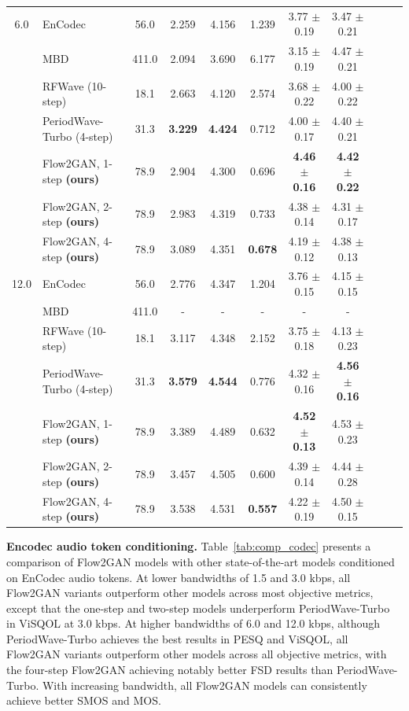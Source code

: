 \documentclass{article} %
\begin{document}
\begin{table}[h]
{\begin{tabular}{c|l|c|cccccccc}
\midrule
6.0 & EnCodec & 56.0 & 2.259 & 4.156 & 1.239 & 3.77 $\pm$ 0.19 & 3.47 $\pm$ 0.21\\
 & MBD & 411.0 & 2.094 & 3.690 & 6.177 & 3.15 $\pm$ 0.19 & 4.47 $\pm$ 0.21\\
& RFWave (10-step) & 18.1 & 2.663 & 4.120 & 2.574 & 3.68 $\pm$ 0.22 & 4.00 $\pm$ 0.22\\
 & PeriodWave-Turbo (4-step) & 31.3 & \textbf{3.229} & \textbf{4.424} & 0.712 & 4.00 $\pm$ 0.17 & 4.40 $\pm$ 0.21\\
& Flow2GAN, 1-step \textbf{(ours)} & 78.9 & 2.904 & 4.300 & 0.696 & \textbf{4.46 $\pm$ 0.16} & \textbf{4.42 $\pm$ 0.22}\\
 & Flow2GAN, 2-step \textbf{(ours)} & 78.9 & 2.983 & 4.319 & 0.733 & 4.38 $\pm$ 0.14 & 4.31 $\pm$ 0.17\\
& Flow2GAN, 4-step \textbf{(ours)} & 78.9 & 3.089 & 4.351 & \textbf{0.678} & 4.19 $\pm$ 0.12 & 4.38 $\pm$ 0.13\\
\midrule
 12.0 & EnCodec & 56.0 & 2.776 & 4.347 & 1.204 & 3.76 $\pm$ 0.15 & 4.15 $\pm$ 0.15\\
& MBD & 411.0 & - & - & - & - & - \\
 & RFWave (10-step) & 18.1 & 3.117 & 4.348 & 2.152 & 3.75 $\pm$ 0.18 & 4.13 $\pm$ 0.23\\
& PeriodWave-Turbo (4-step) & 31.3 & \textbf{3.579} & \textbf{4.544} & 0.776 & 4.32 $\pm$ 0.16 & \textbf{4.56 $\pm$ 0.16}\\
 & Flow2GAN, 1-step \textbf{(ours)} & 78.9 & 3.389 & 4.489 & 0.632 & \textbf{4.52 $\pm$ 0.13} & 4.53 $\pm$ 0.23\\
& Flow2GAN, 2-step \textbf{(ours)}& 78.9 & 3.457 & 4.505 & 0.600 & 4.39 $\pm$ 0.14 & 4.44 $\pm$ 0.28 \\
 & Flow2GAN, 4-step \textbf{(ours)} & 78.9 & 3.538 & 4.531 & \textbf{0.557} & 4.22 $\pm$ 0.19 & 4.50 $\pm$ 0.15\\
\bottomrule
\end{tabular}
}
\vspace{-0.5em}
\end{table}

\noindent\textbf{Encodec audio token conditioning.} 
Table~\ref{tab:comp_codec} presents a comparison of Flow2GAN models with other state-of-the-art models conditioned on EnCodec audio tokens. 
At lower bandwidths of 1.5 and 3.0 kbps, all Flow2GAN variants outperform other models across most objective metrics, except that the one-step and two-step models underperform PeriodWave-Turbo~\citep{periodwave_turbo} in ViSQOL at 3.0 kbps. At higher bandwidths of 6.0 and 12.0 kbps, although PeriodWave-Turbo achieves the best results in PESQ and ViSQOL, all Flow2GAN variants outperform other models across all objective metrics, with the four-step Flow2GAN achieving notably better FSD results than PeriodWave-Turbo.
With increasing bandwidth, all Flow2GAN models can consistently achieve better SMOS and MOS.
\end{document}
